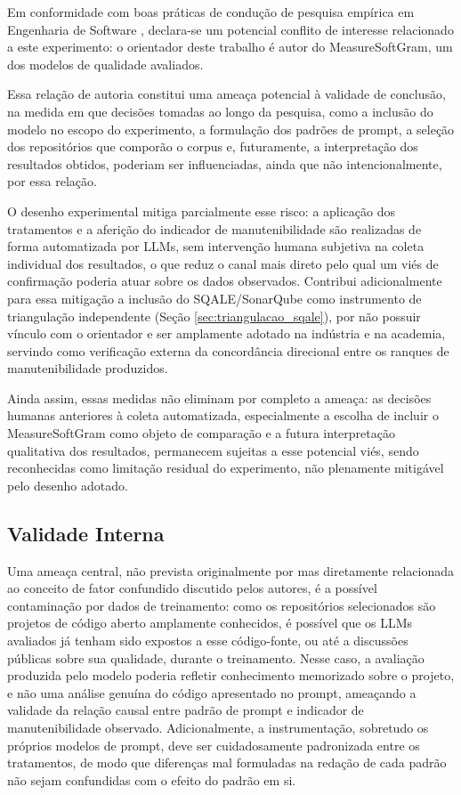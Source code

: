 Em conformidade com boas práticas de condução de pesquisa empírica em Engenharia de Software , declara-se um potencial conflito de interesse relacionado a este experimento: o orientador deste trabalho é autor do MeasureSoftGram, um dos modelos de qualidade avaliados.

Essa relação de autoria constitui uma ameaça potencial à validade de conclusão, na medida em que decisões tomadas ao longo da pesquisa, como a inclusão do modelo no escopo do experimento, a formulação dos padrões de prompt, a seleção dos repositórios que comporão o corpus e, futuramente, a interpretação dos resultados obtidos, poderiam ser influenciadas, ainda que não intencionalmente, por essa relação.

O desenho experimental mitiga parcialmente esse risco: a aplicação dos tratamentos e a aferição do indicador de manutenibilidade são realizadas de forma automatizada por LLMs, sem intervenção humana subjetiva na coleta individual dos resultados, o que reduz o canal mais direto pelo qual um viés de confirmação poderia atuar sobre os dados observados. Contribui adicionalmente para essa mitigação a inclusão do SQALE/SonarQube como instrumento de triangulação independente (Seção \ref{sec:triangulacao_sqale}), por não possuir vínculo com o orientador e ser amplamente adotado na indústria e na academia, servindo como verificação externa da concordância direcional entre os ranques de manutenibilidade produzidos.

Ainda assim, essas medidas não eliminam por completo a ameaça: as decisões humanas anteriores à coleta automatizada, especialmente a escolha de incluir o MeasureSoftGram como objeto de comparação e a futura interpretação qualitativa dos resultados, permanecem sujeitas a esse potencial viés, sendo reconhecidas como limitação residual do experimento, não plenamente mitigável pelo desenho adotado.

\subsection{Validade Interna}

Uma ameaça central, não prevista originalmente por  mas diretamente relacionada ao conceito de fator confundido discutido pelos autores, é a possível contaminação por dados de treinamento: como os repositórios selecionados são projetos de código aberto amplamente conhecidos, é possível que os LLMs avaliados já tenham sido expostos a esse código-fonte, ou até a discussões públicas sobre sua qualidade, durante o treinamento. Nesse caso, a avaliação produzida pelo modelo poderia refletir conhecimento memorizado sobre o projeto, e não uma análise genuína do código apresentado no prompt, ameaçando a validade da relação causal entre padrão de prompt e indicador de manutenibilidade observado. Adicionalmente, a instrumentação, sobretudo os próprios modelos de prompt, deve ser cuidadosamente padronizada entre os tratamentos, de modo que diferenças mal formuladas na redação de cada padrão não sejam confundidas com o efeito do padrão em si.

